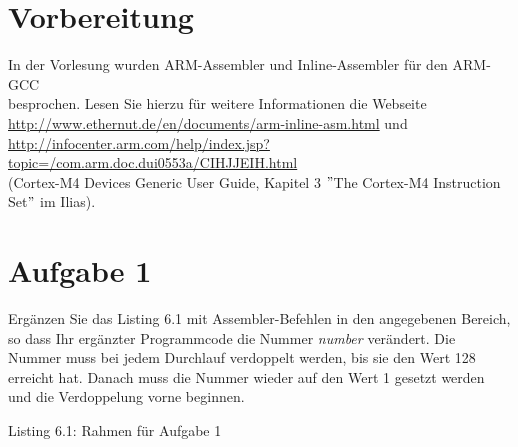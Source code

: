 \newpage
\section{Vorbereitung}
In der Vorlesung wurden ARM-Assembler und Inline-Assembler für den ARM-GCC\\
besprochen. Lesen Sie hierzu für weitere Informationen die Webseite\\
\url{http://www.ethernut.de/en/documents/arm-inline-asm.html} und\\
\url{http://infocenter.arm.com/help/index.jsp?topic=/com.arm.doc.dui0553a/CIHJJEIH.html}\\
(Cortex-M4 Devices Generic User Guide, Kapitel 3 $"$The Cortex-M4 Instruction Set$"$ im Ilias).
\section{Aufgabe 1}
Ergänzen Sie das Listing 6.1 mit Assembler-Befehlen in den angegebenen Bereich, so dass Ihr ergänzter Programmcode die Nummer \textit{number} verändert. Die Nummer muss bei jedem Durchlauf verdoppelt werden, bis sie den Wert 128 erreicht hat. Danach muss die Nummer wieder auf den Wert 1 gesetzt werden und die Verdoppelung vorne beginnen.\\

\begin{center}
	Listing 6.1: Rahmen für Aufgabe 1\\
\end{center}
